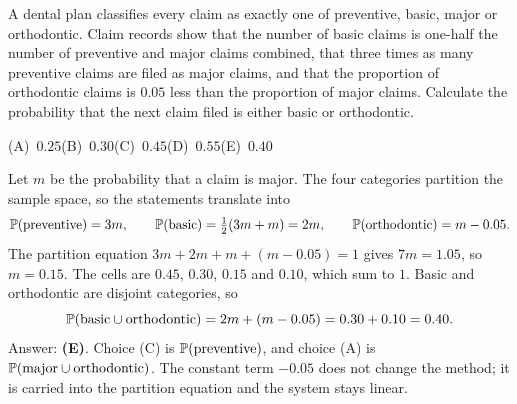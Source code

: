 \begin{example}
A dental plan classifies every claim as exactly one of preventive, basic, major or
orthodontic. Claim records show that the number of basic claims is one-half the number of
preventive and major claims combined, that three times as many preventive claims are filed
as major claims, and that the proportion of orthodontic claims is $0.05$ less than the
proportion of major claims. Calculate the probability that the next claim filed is either
basic or orthodontic.

\smallskip\noindent (A)~$0.25$\hfill (B)~$0.30$\hfill (C)~$0.45$\hfill (D)~$0.55$\hfill (E)~$0.40$\hfill\mbox{}
\end{example}
\begin{solution}
Let $m$ be the probability that a claim is major. The four categories partition the sample
space, so the statements translate into
\[
\mathbb{P}(\text{preventive}) = 3m, \qquad
\mathbb{P}(\text{basic}) = \tfrac12 (3m + m) = 2m, \qquad
\mathbb{P}(\text{orthodontic}) = m - 0.05.
\]
The partition equation $3m + 2m + m + (m - 0.05) = 1$ gives $7m = 1.05$, so $m = 0.15$.
The cells are $0.45$, $0.30$, $0.15$ and $0.10$, which sum to $1$. Basic and orthodontic
are disjoint categories, so
\[
\mathbb{P}(\text{basic} \cup \text{orthodontic}) = 2m + (m - 0.05) = 0.30 + 0.10 = 0.40.
\]
Answer: \textbf{(E)}. Choice (C) is $\mathbb{P}(\text{preventive})$, and choice (A) is
$\mathbb{P}(\text{major} \cup \text{orthodontic})$. The constant term $-0.05$ does not change the
method; it is carried into the partition equation and the system stays linear.
\end{solution}


